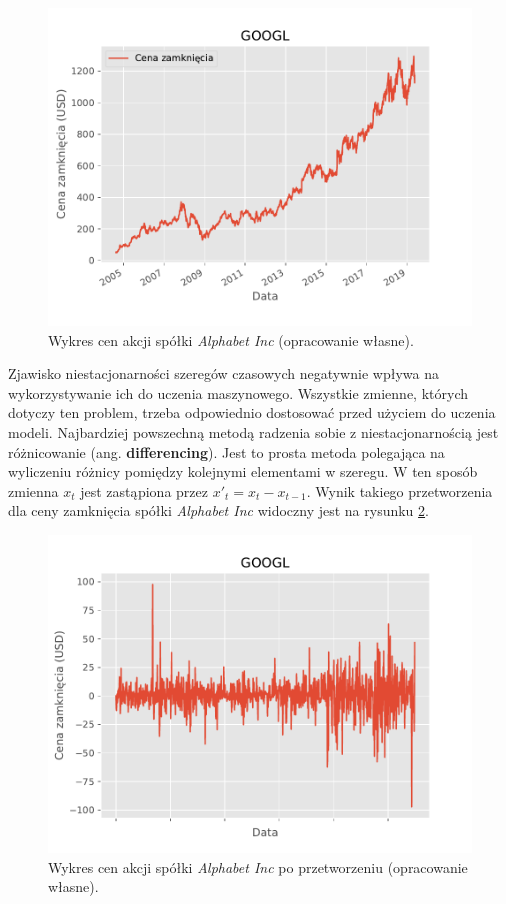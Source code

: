 \documentclass[a4paper, twoside, 11pt, openright]{article}
\begin{document}
\begin{figure}[H]
\centering 
\includegraphics[scale=0.8]{img/GOOGL_adj_close.pdf}
\caption{Wykres cen akcji spółki \textit{Alphabet Inc} (opracowanie własne).}
\label{img:non_stationary_adjusted_close}
\end{figure}

Zjawisko niestacjonarności szeregów czasowych negatywnie wpływa na wykorzystywanie ich do uczenia maszynowego. Wszystkie zmienne, których dotyczy ten problem, trzeba odpowiednio dostosować przed użyciem do uczenia modeli. Najbardziej powszechną metodą radzenia sobie z niestacjonarnością jest różnicowanie (ang. \textbf{differencing}). Jest to prosta metoda polegająca na wyliczeniu różnicy pomiędzy kolejnymi elementami w szeregu. W ten sposób zmienna $x_t$ jest zastąpiona przez $x'_t=x_t-x_{t-1}$. Wynik takiego przetworzenia dla ceny zamknięcia spółki \textit{Alphabet Inc} widoczny jest na rysunku \ref{img:stationary_adjusted_close}.


\begin{figure}[H]
\centering 
\includegraphics[scale=0.8]{img/adjusted_close_stationary.pdf}
\caption{Wykres cen akcji spółki \textit{Alphabet Inc} po przetworzeniu (opracowanie własne).}
\label{img:stationary_adjusted_close}
\end{figure}
\end{document}
